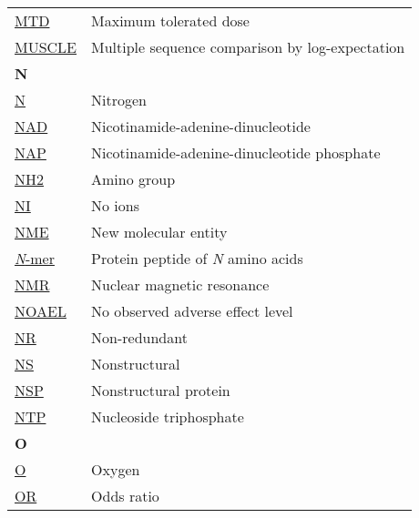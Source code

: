 \begin{longtable}[l]{@{}p{2.5cm}p{12cm}@{}}
\textmd{\href{https://en.wikipedia.org/wiki/Therapeutic_index\#Maximum_tolerated_dose}{MTD}} & Maximum tolerated dose \\
\textmd{\href{https://en.wikipedia.org/wiki/MUSCLE_(alignment_software)}{MUSCLE}} & Multiple sequence comparison by log-expectation  \\[0.3175cm]
\textbf{\large N} & \\[0.25cm]
\textmd{\href{https://en.wikipedia.org/wiki/Nitrogen}{N}} & Nitrogen \\
\textmd{\href{https://www.ebi.ac.uk/pdbe-srv/pdbechem/chemicalCompound/show/NAD}{NAD}} & Nicotinamide-adenine-dinucleotide \\
\textmd{\href{https://www.ebi.ac.uk/pdbe-srv/pdbechem/chemicalCompound/show/NAP}{NAP}} & Nicotinamide-adenine-dinucleotide phosphate \\
\textmd{\href{https://en.wikipedia.org/wiki/Amine}{NH2}} & Amino group \\
\textmd{\href{https://jcheminf.biomedcentral.com/articles/10.1186/s13321-024-00923-z}{NI}} & No ions \\
\textmd{\href{https://en.wikipedia.org/wiki/New_chemical_entity}{NME}} & New molecular entity \\
\textmd{\href{https://en.wikipedia.org/wiki/Peptide}{\textit{N}-mer}} & Protein peptide of \textit{N} amino acids \\
\textmd{\href{https://en.wikipedia.org/wiki/Nuclear_magnetic_resonance_spectroscopy}{NMR}} & Nuclear magnetic resonance \\
\textmd{\href{https://en.wikipedia.org/wiki/No-observed-adverse-effect_level}{NOAEL}} & No observed adverse effect level \\
\textmd{\href{https://jcheminf.biomedcentral.com/articles/10.1186/s13321-024-00923-z}{NR}} & Non-redundant \\
\textmd{\href{https://en.wikipedia.org/wiki/Viral_nonstructural_protein}{NS}} & Nonstructural \\
\textmd{\href{https://en.wikipedia.org/wiki/Viral_nonstructural_protein}{NSP}} & Nonstructural protein \\
\textmd{\href{https://en.wikipedia.org/wiki/Nucleoside_triphosphate}{NTP}} & Nucleoside triphosphate \\[0.3175cm]
\textbf{\large O} & \\[0.25cm]
\textmd{\href{https://en.wikipedia.org/wiki/Oxygen}{O}} & Oxygen \\
\textmd{\href{https://en.wikipedia.org/wiki/Odds_ratio}{OR}} & Odds ratio \\[0.3175cm]

\end{longtable}
